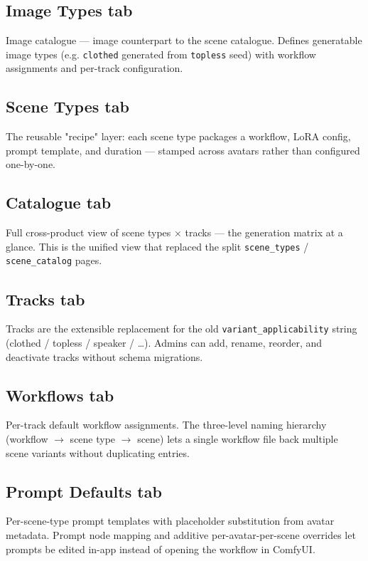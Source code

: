 \subsection{Image Types tab}
Image catalogue — image counterpart to the scene catalogue. Defines generatable
image types (e.g. \texttt{clothed} generated from \texttt{topless} seed) with
workflow assignments and per-track configuration.

\subsection{Scene Types tab}
The reusable "recipe" layer: each scene type packages a workflow, LoRA config,
prompt template, and duration — stamped across avatars rather than configured
one-by-one.

\subsection{Catalogue tab}
Full cross-product view of scene types × tracks — the generation matrix at a
glance. This is the unified view that replaced the split \texttt{scene\_types} /
\texttt{scene\_catalog} pages.

\subsection{Tracks tab}
Tracks are the extensible replacement for the old \texttt{variant\_applicability}
string (clothed / topless / speaker / …). Admins can add, rename, reorder, and
deactivate tracks without schema migrations.

\subsection{Workflows tab}
Per-track default workflow assignments. The three-level naming hierarchy
(workflow $\rightarrow$ scene type $\rightarrow$ scene) lets a single workflow
file back multiple scene variants without duplicating entries.


\subsection{Prompt Defaults tab}
Per-scene-type prompt templates with placeholder substitution from avatar
metadata. Prompt node mapping and additive per-avatar-per-scene overrides let
prompts be edited in-app instead of opening the workflow in ComfyUI.

